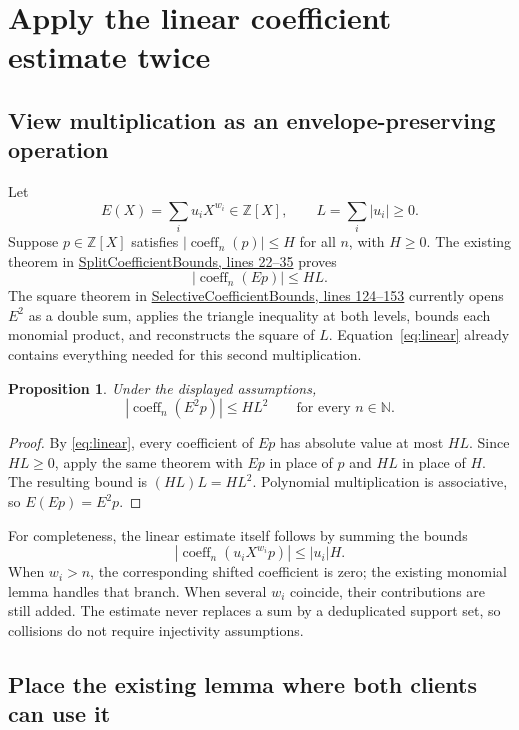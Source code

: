\documentclass[11pt,letterpaper]{article}
\newcommand{\code}[1]{\texttt{\small\detokenize{#1}}}
\newcommand{\src}[3]{\href{https://github.com/VladimirReshetnikov/ProveIt/blob/89226e3921bce3e8949fadd12d3efb6914c7630c/Computability/DiophantineConsistency/Lean/DiophantineConsistency/#1.lean\#L#2-L#3}{\textsf{#1}, lines #2--#3}}
\newcommand{\N}{\mathbb{N}}
\newcommand{\Z}{\mathbb{Z}}
\newcommand{\coeff}{\operatorname{coeff}}
\newtheorem{proposition}{Proposition}[section]
\begin{document}
\section{Apply the linear coefficient estimate twice}
\label{sec:coefficients}

\subsection{View multiplication as an envelope-preserving operation}

Let
\[
 E(X)=\sum_i u_iX^{w_i}\in\Z[X],
 \qquad L=\sum_i|u_i|\ge0.
\]
Suppose $p\in\Z[X]$ satisfies $|\coeff_n(p)|\le H$ for all $n$, with $H\ge0$. The existing theorem \code{abs_coeff_linear_mul_le} in \src{SplitCoefficientBounds}{22}{35} proves
\begin{equation}
  |\coeff_n(Ep)|\le HL.
  \label{eq:linear}
\end{equation}
The square theorem in \src{SelectiveCoefficientBounds}{124}{153} currently opens $E^2$ as a double sum, applies the triangle inequality at both levels, bounds each monomial product, and reconstructs the square of $L$. Equation~\eqref{eq:linear} already contains everything needed for this second multiplication.

\begin{proposition}
Under the displayed assumptions,
\[
  |\coeff_n(E^2p)|\le HL^2
  \qquad\text{for every }n\in\N.
\]
\end{proposition}
\begin{proof}
By \eqref{eq:linear}, every coefficient of $Ep$ has absolute value at most $HL$. Since $HL\ge0$, apply the same theorem with $Ep$ in place of $p$ and $HL$ in place of $H$. The resulting bound is $(HL)L=HL^2$. Polynomial multiplication is associative, so $E(Ep)=E^2p$.
\end{proof}

For completeness, the linear estimate itself follows by summing the bounds
\[
  |\coeff_n(u_iX^{w_i}p)|\le |u_i|H.
\]
When $w_i>n$, the corresponding shifted coefficient is zero; the existing monomial lemma handles that branch. When several $w_i$ coincide, their contributions are still added. The estimate never replaces a sum by a deduplicated support set, so collisions do not require injectivity assumptions.

\subsection{Place the existing lemma where both clients can use it}
\end{document}
